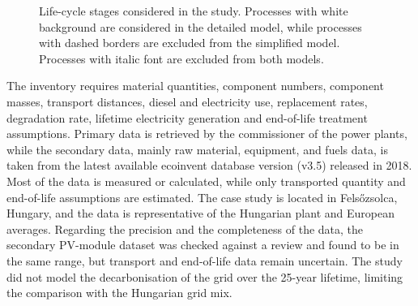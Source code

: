 \documentclass[9pt]{extarticle}
\begin{document}
\begin{figure}[H]
{%
    }
\caption{Life-cycle stages considered in the study. Processes with white background are considered in the detailed model, while processes with dashed borders are
excluded from the simplified model. Processes with italic font are excluded from both models.
}
\end{figure}

The inventory requires material quantities, component numbers, component masses,
transport distances, diesel and electricity use, replacement rates, degradation rate,
lifetime electricity generation and end-of-life treatment assumptions. Primary data is
retrieved by the commissioner of the power plants, while the secondary data, mainly
raw material, equipment, and fuels data, is taken from the latest available ecoinvent
database version (v3.5) released in 2018.
Most of the data is measured or calculated, while only transported quantity and
end-of-life assumptions are estimated. The case study is located in Felsőzsolca,
Hungary, and the data is representative of the Hungarian plant and European averages.
Regarding the precision and the completeness of the data, the secondary PV-module dataset
was checked against a review and found to be in the same range, but transport and
end-of-life data remain uncertain. The study did not model the decarbonisation of the
grid over the 25-year lifetime, limiting the comparison with the Hungarian grid mix.
\end{document}
